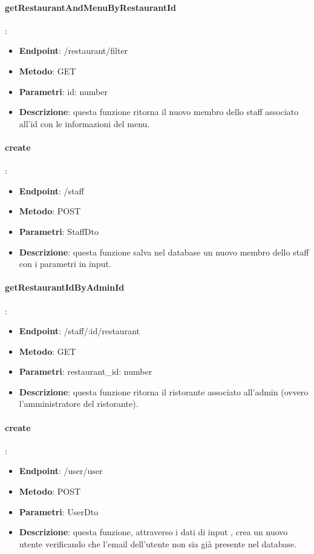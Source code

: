\paragraph{getRestaurantAndMenuByRestaurantId}:
\begin{itemize}
    \item \textbf{Endpoint}: /restaurant/filter
    \item \textbf{Metodo}: GET
    \item \textbf{Parametri}: id: number
    \item \textbf{Descrizione}: questa funzione ritorna il nuovo membro dello staff associato all'id con le informazioni del menu.
\end{itemize}

\paragraph{create}:
\begin{itemize}
    \item \textbf{Endpoint}: /staff
    \item \textbf{Metodo}: POST
    \item \textbf{Parametri}: StaffDto
    \item \textbf{Descrizione}: questa funzione salva nel database un nuovo membro dello staff con i parametri in input.
\end{itemize}
\paragraph{getRestaurantIdByAdminId}:
\begin{itemize}
    \item \textbf{Endpoint}: /staff/:id/restaurant
    \item \textbf{Metodo}: GET 
    \item \textbf{Parametri}: restaurant\_id: number
    \item \textbf{Descrizione}: questa funzione ritorna il ristorante associato all’admin (ovvero l'amministratore del ristorante).
\end{itemize}

\paragraph{create}:
\begin{itemize}
    \item \textbf{Endpoint}: /user/user
    \item \textbf{Metodo}: POST
    \item \textbf{Parametri}: UserDto
    \item \textbf{Descrizione}: questa funzione, attraverso i dati di input , crea un nuovo utente verificando che l'email dell'utente non sia già presente nel database.
\end{itemize}
